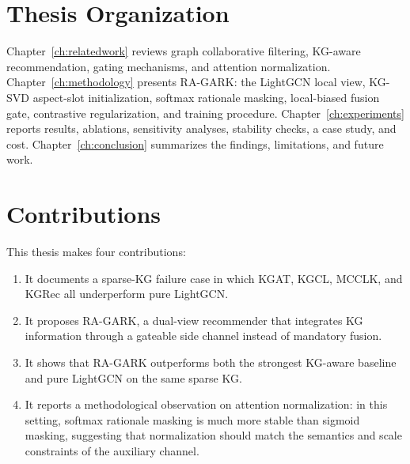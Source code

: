\section{Thesis Organization}
\label{sec:intro-organization}

Chapter~\ref{ch:relatedwork} reviews graph collaborative filtering, KG-aware recommendation, gating mechanisms, and attention normalization. Chapter~\ref{ch:methodology} presents RA-GARK: the LightGCN local view, KG-SVD aspect-slot initialization, softmax rationale masking, local-biased fusion gate, contrastive regularization, and training procedure. Chapter~\ref{ch:experiments} reports results, ablations, sensitivity analyses, stability checks, a case study, and cost. Chapter~\ref{ch:conclusion} summarizes the findings, limitations, and future work.

\section{Contributions}
\label{sec:intro-contributions}

This thesis makes four contributions:

\begin{enumerate}
  \item It documents a sparse-KG failure case in which KGAT, KGCL, MCCLK, and KGRec all underperform pure LightGCN.
  \item It proposes RA-GARK, a dual-view recommender that integrates KG information through a gateable side channel instead of mandatory fusion.
  \item It shows that RA-GARK outperforms both the strongest KG-aware baseline and pure LightGCN on the same sparse KG.
  \item It reports a methodological observation on attention normalization: in this setting, softmax rationale masking is much more stable than sigmoid masking, suggesting that normalization should match the semantics and scale constraints of the auxiliary channel.
\end{enumerate}
